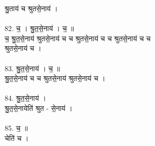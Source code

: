 श्रु॒ताय॑ च श्रुतसे॒नाय॑ ।\\
\\
82. च॒ । श्रु॒त॒से॒नाय॑ । च॒ ॥\\
च॒ श्रु॒त॒से॒नाय॑ श्रुतसे॒नाय॑ च च श्रुतसे॒नाय॑ च च श्रुतसे॒नाय॑ च च\\
श्रुतसे॒नाय॑ च ।\\
\\
83. श्रु॒त॒से॒नाय॑ । च॒ ॥\\
श्रु॒त॒से॒नाय॑ च च श्रुतसे॒नाय॑ श्रुतसे॒नाय॑ च ।\\
\\
84. श्रु॒त॒से॒नाय॑ ।\\
श्रु॒त॒से॒नायेति॑ श्रुत - से॒नाय॑ ।\\
\\
85. च॒ ॥\\
चेति॑ च ।\\
